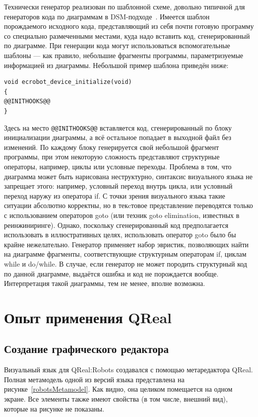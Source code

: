 \documentclass[a4paper]{article}
\begin{document}
{Технически генератор реализован по шаблонной схеме, довольно типичной для генераторов кода по диаграммам в DSM-подходе~\cite{theBook}. Имеется шаблон порождаемого исходного кода, представляющий из себя почти готовую программу со специально размеченными местами, куда надо вставить код, сгенерированный по диаграмме. При генерации кода могут использоваться вспомогательные шаблоны --- как правило, небольшие фрагменты программы, параметризуемые информацией из диаграммы. Небольшой пример шаблона приведён ниже:
\begin{verbatim}
void ecrobot_device_initialize(void)
{
@@INITHOOKS@@
}
\end{verbatim}
Здесь на место \verb|@@INITHOOKS@@| вставляется код, сгенерированный по блоку инициализации диаграммы, а всё остальное попадает в выходной файл без изменений. По каждому блоку генерируется свой небольшой фрагмент программы, при этом некоторую сложность представляют структурные операторы, например, циклы или условные переходы. Проблема в том, что диаграмма может быть нарисована неструктурно, синтаксис визуального языка не запрещает этого: например, условный переход внутрь цикла, или условный переход наружу из оператора if. С точки зрения визуального языка такие ситуации абсолютно корректны, но в текcтовое представление переводятся только с использованием операторов goto (или техник goto elimination, известных в реинжиниринге). Однако, поскольку сгенерированный код предполагается использовать в иллюстративных целях, использовать оператор goto было бы крайне нежелательно. Генератор применяет набор эвристик, позволяющих найти на диаграмме фрагменты, соответствующие структурным операторам if, циклам while и do/while. В случае, если генератор не может породить структурный код по данной диаграмме, выдаётся ошибка и код не порождается вообще. Интерпретация такой диаграммы, тем не менее, вполне возможна.

\section{Опыт применения QReal}
\subsection{Создание графического редактора}
Визуальный язык для QReal:Robots создавался с помощью метаредактора QReal. Полная метамодель одной из версий языка представлена на рисунке~\ref{robotsMetamodel}. Как видно, она целиком помещается на одном экране. Все элементы также имеют свойства (в том числе, внешний вид), которые на рисунке не показаны.

}
\end{document}
